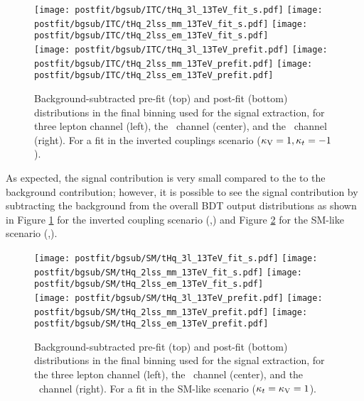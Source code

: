 \begin{figure} [!h]
 \centering
 \texttt{[image: postfit/bgsub/ITC/tHq\_3l\_13TeV\_fit\_s.pdf]}
 \texttt{[image: postfit/bgsub/ITC/tHq\_2lss\_mm\_13TeV\_fit\_s.pdf]}
 \texttt{[image: postfit/bgsub/ITC/tHq\_2lss\_em\_13TeV\_fit\_s.pdf]}\\
 \texttt{[image: postfit/bgsub/ITC/tHq\_3l\_13TeV\_prefit.pdf]}
 \texttt{[image: postfit/bgsub/ITC/tHq\_2lss\_mm\_13TeV\_prefit.pdf]}
 \texttt{[image: postfit/bgsub/ITC/tHq\_2lss\_em\_13TeV\_prefit.pdf]} 
\caption[Background-subtracted distributions in the final binning (ITC).]{Background-subtracted pre-fit (top) and post-fit (bottom) distributions in the final binning used for the signal extraction, for three lepton channel (left), the \mumu\ channel (center), and the \emu\ channel (right). For a fit in the inverted couplings scenario (${\kappa_\text{V}=1,\kappa_t=-1}$).}
\label{fig:postfit_bgsub_ITC}
\end{figure}

As expected, the signal contribution is very small compared to the to the background contribution; however, it is possible to see the signal contribution by subtracting the background from the overall BDT output distributions as shown in Figure \ref{fig:postfit_bgsub_ITC} for the inverted coupling scenario (,) and Figure \ref{fig:postfit_bgsub_SM} for the SM-like scenario (,).  

\begin{figure} [!h]
 \centering
 \texttt{[image: postfit/bgsub/SM/tHq\_3l\_13TeV\_fit\_s.pdf]}       
 \texttt{[image: postfit/bgsub/SM/tHq\_2lss\_mm\_13TeV\_fit\_s.pdf]}
 \texttt{[image: postfit/bgsub/SM/tHq\_2lss\_em\_13TeV\_fit\_s.pdf]}\\
 \texttt{[image: postfit/bgsub/SM/tHq\_3l\_13TeV\_prefit.pdf]}
 \texttt{[image: postfit/bgsub/SM/tHq\_2lss\_mm\_13TeV\_prefit.pdf]}
 \texttt{[image: postfit/bgsub/SM/tHq\_2lss\_em\_13TeV\_prefit.pdf]} 
\caption[Background-subtracted distributions in the final binning (SM)]{Background-subtracted pre-fit (top) and post-fit (bottom) distributions in the final binning used for the signal extraction, for the three lepton channel (left), the \mumu\ channel (center), and the \emu\ channel (right). For a fit in the SM-like scenario (${\kappa_t=\kappa_\text{V}=1}$).}
\label{fig:postfit_bgsub_SM}
\end{figure}

